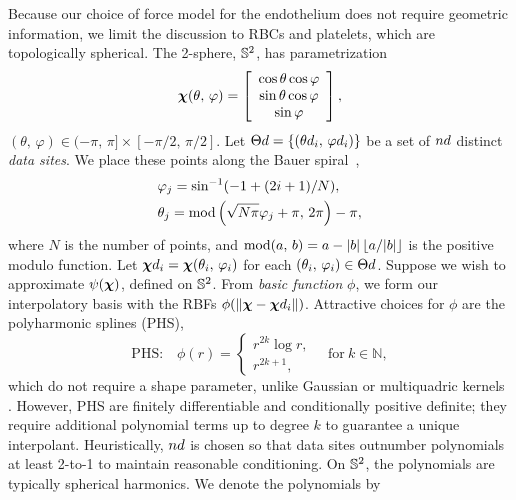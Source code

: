 Because our choice of force model for the endothelium does not require geometric
information, we limit the discussion to RBCs and platelets, which are topologically
spherical. The 2-sphere, $\mathbb{S}^2$, has parametrization
\begin{equation*}
    \boldsymbol{\chi}(\theta,\,\varphi) =
    \left[\begin{array}{c}
        \cos\theta\cos\varphi \\
        \sin\theta\cos\varphi \\
        \sin\varphi
    \end{array}\right],
\end{equation*}
$(\theta,\,\varphi)\in(-\pi,\,\pi]\times[-\pi/2,\,\pi/2]$.
Let $\data\sites = \{(\data\theta_i,\,\data\varphi_i)\}$ be a set of $\data\cardinality$
distinct \emph{data sites}. We place these points along the Bauer spiral~\cite{Bauer:2000km},
\begin{equation}\label{eq:bauer-spiral}
    \begin{aligned}
        &\varphi_j = \sin^{-1}(-1 + (2i + 1) / N), \\
        &\theta_j = \operatorname{mod}\left(\sqrt{N\pi}\varphi_j + \pi,\,2\pi\right) - \pi,
    \end{aligned}
\end{equation}
where $N$ is the number of points, and $\operatorname{mod}(a,\,b) = a - |b|\left\lfloor{a/|b|}\right\rfloor$ is the
positive modulo function. Let $\data\Xp_i = \Xp(\theta_i,\,\varphi_i)$ for each
$(\theta_i,\,\varphi_i) \in \data\sites$. Suppose we wish to approximate $\psi(\boldsymbol{\chi})$,
defined on $\mathbb{S}^2$. From \emph{basic function} $\phi$, we form our interpolatory basis
with the RBFs $\phi(\|\Xp-\data\Xp_i\|)$. Attractive choices for $\phi$ are the
polyharmonic splines (PHS),
\begin{equation*}
    \text{PHS:}\quad\phi(r) = \begin{cases}
        r^{2k} \log r, \\
        r^{2k+1},
    \end{cases}
    \quad\text{for}\ k\in\mathbb{N},
\end{equation*}
which do not require a shape parameter, unlike Gaussian or multiquadric kernels~%
\cite{Fasshauer:2007ui}. However, PHS are finitely differentiable and conditionally
positive definite; they require additional polynomial terms up to degree $k$ to guarantee
a unique interpolant. Heuristically, $\data\cardinality$ is chosen so that data sites
outnumber polynomials at least 2-to-1 to maintain reasonable conditioning. On $\mathbb{S}^2$,
the polynomials are typically spherical harmonics. We denote the polynomials by

